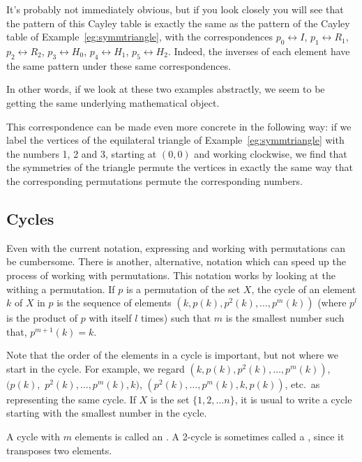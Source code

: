 \begin{example}
  It's probably not immediately obvious, but if you look closely you will see
  that the pattern of this Cayley table is exactly the same as the pattern of
  the Cayley table of Example~\ref{eg:symmtriangle}, with the correspondences
    $p_{0} \leftrightarrow I$,
    $p_{1} \leftrightarrow R_{1}$,
    $p_{2} \leftrightarrow R_{2}$,
    $p_{3} \leftrightarrow H_{0}$,
    $p_{4} \leftrightarrow H_{1}$,
    $p_{5} \leftrightarrow H_{2}$.
  Indeed, the inverses of each element have the same pattern under these same
  correspondences.
  
  In other words, if we look at these two examples abstractly, we seem to be
  getting the same underlying mathematical object.
  
  This correspondence can be made even more concrete in the following way: if
  we label the vertices of the equilateral triangle of Example~\ref{eg:symmtriangle}
  with the numbers 1, 2 and 3, starting at $(0,0)$ and working clockwise, we
  find that the symmetries of the triangle permute the vertices in exactly
  the same way that the corresponding permutations permute the corresponding
  numbers.
\end{example}

\subsection{Cycles}

Even with the current notation, expressing and working with permutations can
be cumbersome.  There is another, alternative, notation which can speed up
the process of working with permutations.  This notation works by looking at
the  withing a permutation.  If $p$ is a permutation
of the set $X$, the cycle of an element $k$ of $X$ in $p$ is the sequence
of elements $(k, p(k), p^{2}(k), \ldots, p^{m}(k))$ (where $p^{l}$ is the product
of $p$ with itself $l$ times) such that $m$ is the smallest number such that,
$p^{m+1}(k) = k$.

Note that the order of the elements in a cycle is important, but not where we
start in the cycle.  For example, we regard $(k, p(k), p^{2}(k), \ldots, p^{m}(k))$,
$(p(k),$ $p^{2}(k),\ldots, p^{m}(k), k)$, $(p^{2}(k), \ldots, p^{m}(k), k, p(k))$, etc.\ as
representing the same cycle.  If $X$ is the set $\{1, 2, \ldots n\}$, it is
usual to write a cycle starting with the smallest number in the cycle.

A cycle with $m$ elements is called an .  A 2-cycle
is sometimes called a , since it transposes
two elements.

